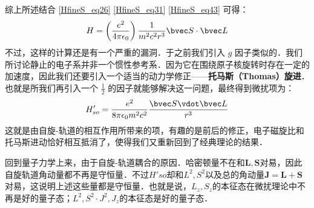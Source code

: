 综上所述结合 \autoref{HfineS_eq26} \autoref{HfineS_eq31} \autoref{HfineS_eq43} 可得：
\begin{equation}
H=\left(\frac{e^2}{4\pi\epsilon_0}\right)\frac{1}{m^2c^2r^3}\bvec S \cdot \bvec L
\end{equation}
不过，这样的计算还是有一个严重的漏洞．于之前我们引入 $g$ 因子类似的．我们所讨论静止的电子系并非一个惯性参考系．因为它在围绕原子核旋转时存在一定的加速度，因此我们还要引入一个适当的动力学修正——\textbf{托马斯（Thomas）旋进}．也就是所我们再引入一个 $\frac{1}{2}$ 的因子就能够解决这一问题，最终得到微扰项为：
\begin{equation}
H'_{so} = \frac{e^2}{8\pi \epsilon_0 m^2 c^2} \frac{\bvec S \vdot \bvec L}{r^3}
\end{equation}
这就是由自旋-轨道的相互作用所带来的项，有趣的是前后的修正，电子磁旋比和托马斯进动恰好相互抵消了，使得我们又重新回到了经典理论的结果．

回到量子力学上来，由于自旋-轨道耦合的原因．哈密顿量不在和$\mathbf{L,S}$对易，因此自旋轨道角动量都不再是守恒量．不过$H'{so}$却和$L^2,S^2$以及总的角动量$\mathbf{J=L+S}$对易，这说明上述这些量都是守恒量．也就是说，$L_z,S_z$的本征态在微扰理论中不再是好的量子态；$L^2,S^2\cdot J^2,J_z$的本征态是好的量子态．

